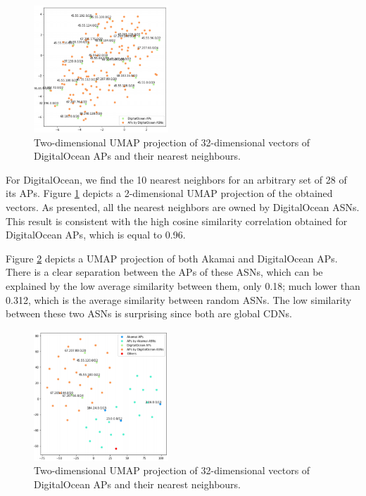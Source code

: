 \documentclass[10pt,journal]{IEEEtran}
\begin{document}
\begin{figure}[h]
\centering
\includegraphics[width=0.45\textwidth]{figures/fig5.png}
\caption{Two-dimensional UMAP projection of 32-dimensional vectors of DigitalOcean APs and their nearest neighbours.}
\label{fig:umap_digitalocean}
\end{figure}

For DigitalOcean, we find the 10 nearest neighbors for an arbitrary set of 28 of its APs. Figure \ref{fig:umap_digitalocean} depicts a 2-dimensional UMAP \cite{mcinnes2018umap} projection of the obtained vectors. As presented, all the nearest neighbors are owned by DigitalOcean ASNs. This result is consistent with the high cosine similarity correlation obtained for DigitalOcean APs, which is equal to 0.96.

Figure \ref{fig:umap_comparison} depicts a UMAP projection of both Akamai and DigitalOcean APs. There is a clear separation between the APs of these ASNs, which can be explained by the low average similarity between them, only 0.18; much lower than 0.312, which is the average similarity between random ASNs. The low similarity between these two ASNs is surprising since both are global CDNs.

\begin{figure}[h]
\centering
\includegraphics[width=0.45\textwidth]{figures/fig6.png}
\caption{Two-dimensional UMAP projection of 32-dimensional vectors of DigitalOcean APs and their nearest neighbours.}
\label{fig:umap_comparison}
\end{figure}
\end{document}
